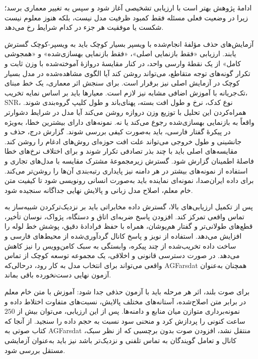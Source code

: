 
ادامهٔ پژوهش بهتر است با ارزیابی تشخیصی آغاز شود و سپس به تغییر معماری برسد؛ زیرا در وضعیت فعلی مسئله فقط کمبود ظرفیت مدل نیست، بلکه هنوز معلوم نیست شکست یا موفقیت هر جزء در کدام شرایط رخ می‌دهد.


 آزمایش‌های حذف مؤلفهٔ انجام‌شده با ویسپر بسیار کوچک باید به ویسپر-کوچک گسترش یابند. ارزیابی «فقط بازنمایی اصلی»، «فقط بازنمایی بهسازی‌شده» و «همجوشی کامل» از یک نقطهٔ وارسی واحد، در کنار مقایسهٔ دروازهٔ آموخته‌شده با وزن ثابت و تکرار گونه‌های توجه متقاطع، می‌تواند روشن کند آیا الگوی مشاهده‌شده در مدل بسیار کوچک در آزمایش اصلی نیز برقرار است. برای سنجش اثر معماری، یک خط مبنای تک‌جریانه با آموزش اضافی مشابه نیز لازم است.
 معیارها باید بر اساس نمایه تخریب، SNR، نوع کدک، نرخ و طول افت بسته، پهنای‌باند و طول کلیپ گروه‌بندی شوند. همراه‌کردن این تحلیل با توزیع وزن دروازه روشن می‌کند آیا مدل در شرایط دشوارتر واقعاً به بازنمایی بهسازی‌شده رجوع می‌کند یا نه.
 نمونه‌های دارای بیشترین خطا، به‌ویژه در پیکرهٔ گفتار فارسی، باید به‌صورت کیفی بررسی شوند. گزارش درج، حذف و جانشینی و طول خروجی می‌تواند علت افت حوزه‌ای روش‌های ادغام را روشن کند.
 مقایسه‌های اصلی باید با چند بذر تصادفی تکرار شوند و برای اختلاف نرخ‌های خطا فاصلهٔ اطمینان گزارش شود. گسترش زیرمجموعهٔ مشترک مقایسه با مدل‌های تجاری و استفاده از نمونه‌های بیشتر در هر دامنه نیز پایداری رتبه‌بندی آن‌ها را روشن‌تر می‌کند.
 برای داده ایران‌صدا، نمونه‌ای نماینده باید به‌صورت انسانی رونویسی شود تا کیفیت متن خام معلم، اصلاح مدل زبانی و پالایش نهایی جداگانه سنجیده شود.


پس از تکمیل ارزیابی‌های بالا، گسترش داده مخابراتی باید بر نزدیک‌ترکردن شبیه‌ساز به تماس واقعی تمرکز کند. افزودن پاسخ ضربه‌ای اتاق و دستگاه، پژواک، نوسان تأخیر، قطع‌های طولانی‌تر و گفتار هم‌پوشان، همراه با حفظ فرادادهٔ دقیق، پوشش خط لوله را افزایش می‌دهد. استفاده از نویز و پاسخ کانال گردآوری‌شده از محیط‌های فارسی و ساخت داده تخریب‌شده از چند پیکره، وابستگی به سبک کامن‌وویس را نیز کاهش می‌دهد. در صورت دسترسی قانونی و اخلاقی، یک مجموعه توسعه کوچک از تماس واقعی می‌تواند برای انتخاب مدل به کار رود، درحالی‌که AGFarsdat همچنان به‌عنوان آزمون نهایی دست‌نخورده باقی بماند.

برای صوت بلند، اثر هر مرحله باید با آزمون حذفی جدا شود: آموزش با متن خام معلم در برابر متن اصلاح‌شده، آستانه‌های مختلف پالایش، نسبت‌های متفاوت اختلاط داده و نمونه‌برداری متوازن میان منابع و دامنه‌ها. پس از این ارزیابی، می‌توان بیش از $250$ ساعت کنونی را پردازش کرد و منحنی سود نسبت به حجم داده را سنجید. از آنجا که کتاب صوتی به AGFarsdat منتقل نشد، افزودن صوت بدون برچسبی که از نظر سبک، کانال و تعامل گویندگان به تماس تلفنی و  نزدیک‌تر باشد نیز باید به‌عنوان آزمایشی مستقل بررسی شود.

